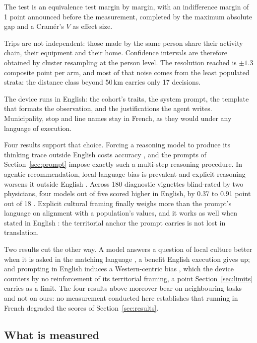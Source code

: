 The test is an equivalence test margin by margin, with an indifference margin of 1 point announced before the measurement, completed by the maximum absolute gap and a Cramér's $V$ as effect size.

Trips are not independent: those made by the same person share their activity chain, their equipment and their home. Confidence intervals are therefore obtained by cluster resampling at the person level. The resolution reached is $\pm 1.3$ composite point per arm, and most of that noise comes from the least populated strata: the distance class beyond 50\,km carries only 17 decisions.

The device runs in English: the cohort's traits, the system prompt, the template that formats the observation, and the justifications the agent writes. Municipality, stop and line names stay in French, as they would under any language of execution.

Four results support that choice. Forcing a reasoning model to produce its thinking trace outside English costs accuracy \citep{qi2025thinking}, and the prompts of Section~\ref{sec:prompt} impose exactly such a multi-step reasoning procedure. In agentic recommendation, local-language bias is prevalent and explicit reasoning worsens it outside English \citep{liu2025agenticbias}. Across 180 diagnostic vignettes blind-rated by two physicians, four models out of five scored higher in English, by 0.37 to 0.91 point out of 18 \citep{bazoge2026prompting}. Explicit cultural framing finally weighs more than the prompt's language on alignment with a population's values, and it works as well when stated in English \citep{bulte2026cultural}: the territorial anchor the prompt carries is not lost in translation.

Two results cut the other way. A model answers a question of local culture better when it is asked in the matching language \citep{ying2025disentangling}, a benefit English execution gives up; and prompting in English induces a Western-centric bias \citep{soegeng2026crosslingual}, which the device counters by no reinforcement of its territorial framing, a point Section~\ref{sec:limits} carries as a limit. The four results above moreover bear on neighbouring tasks and not on ours: no measurement conducted here establishes that running in French degraded the scores of Section~\ref{sec:results}.

\subsection{What is measured}
\label{sec:quantities}


